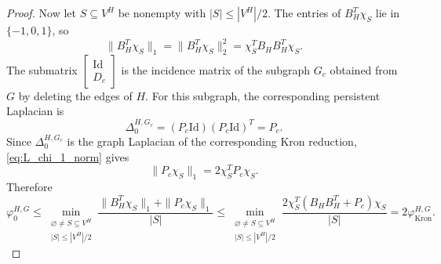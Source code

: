 \documentclass{article}
\newcommand{\id}{\mathrm{Id}}
\begin{document}
\begin{proof}
Now let \(S\subseteq V^H\) be nonempty with \(|S|\leq |V^H|/2\). The entries of \(B_H^T\chi_S\) lie in \(\{-1,0,1\}\), so
\[
\|B_H^T\chi_S\|_1=\|B_H^T\chi_S\|_2^2=\chi_S^TB_HB_H^T\chi_S.
\]
The submatrix \(\begin{bmatrix}\id\\D_c\end{bmatrix}\) is the incidence matrix of the subgraph \(G_c\) obtained from \(G\) by deleting the edges of \(H\). For this subgraph, the corresponding persistent Laplacian is
\[
\Delta_0^{H,G_c}=(P_c\id)(P_c\id)^T=P_c.
\]
Since \(\Delta_0^{H,G_c}\) is the graph Laplacian of the corresponding Kron reduction, \cref{eq:L_chi_1_norm} gives
\[
\|P_c\chi_S\|_1=2\chi_S^TP_c\chi_S.
\]
Therefore
\[
\varphi_0^{H,G}\leq
\min_{\substack{\varnothing\neq S\subseteq V^H\\ |S|\leq |V^H|/2}}
\frac{\|B_H^T\chi_S\|_1+\|P_c\chi_S\|_1}{|S|}
\leq
\min_{\substack{\varnothing\neq S\subseteq V^H\\ |S|\leq |V^H|/2}}
\frac{2\chi_S^T(B_HB_H^T+P_c)\chi_S}{|S|}
=
2\varphi_{\operatorname{Kron}}^{H,G}.
\]
\end{proof}
\end{document}
